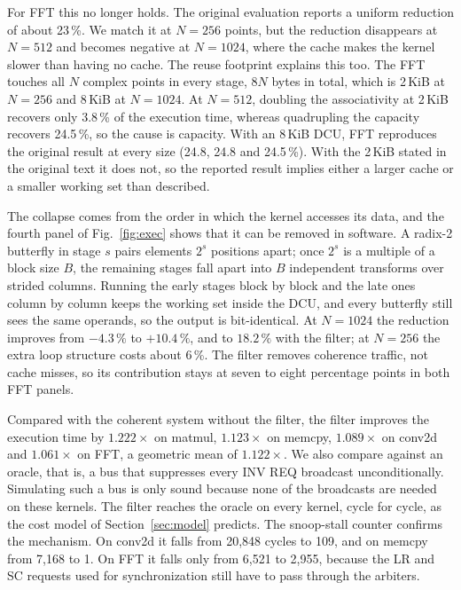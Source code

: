 \documentclass[conference]{IEEEtran}
\begin{document}
For FFT this no longer holds. The original evaluation reports a uniform
reduction of about 23\,\%. We match it at $N{=}256$ points, but the reduction
disappears at $N{=}512$ and becomes negative at $N{=}1024$, where the cache
makes the kernel slower than having no cache. The reuse footprint explains
this too. The FFT touches all $N$ complex points in every stage, $8N$
bytes in total, which is 2\,KiB at $N{=}256$ and 8\,KiB at $N{=}1024$. At
$N{=}512$, doubling the associativity at 2\,KiB recovers only 3.8\,\% of the
execution time, whereas quadrupling the capacity recovers 24.5\,\%, so the
cause is capacity. With an 8\,KiB DCU, FFT reproduces the original result at
every size (24.8, 24.8 and 24.5\,\%). With the 2\,KiB stated in the original
text it does not, so the reported result implies either a larger cache or a
smaller working set than described.

The collapse comes from the order in which the kernel accesses its data, and
the fourth panel of Fig.~\ref{fig:exec} shows that it can be removed in
software. A radix-2 butterfly in stage $s$ pairs elements $2^s$ positions
apart; once $2^s$ is a multiple of a block size $B$, the remaining stages fall
apart into $B$ independent transforms over strided columns. Running the early
stages block by block and the late ones column by column keeps the working set
inside the DCU, and every butterfly still sees the same operands, so the
output is bit-identical. At $N{=}1024$ the reduction improves from
$-4.3\,\%$ to $+10.4\,\%$, and to $18.2\,\%$ with the filter; at $N{=}256$ the
extra loop structure costs about 6\,\%. The filter removes coherence traffic,
not cache misses, so its contribution stays at seven to eight percentage
points in both FFT panels.

Compared with the coherent system without the filter, the filter improves the
execution time by $1.222\times$ on matmul, $1.123\times$ on memcpy,
$1.089\times$ on conv2d and $1.061\times$ on FFT, a geometric mean of
$1.122\times$. We also compare against an oracle, that is, a bus that
suppresses every INV REQ broadcast unconditionally. Simulating such a bus is
only sound because none of the broadcasts are needed on these kernels. The
filter reaches the oracle on every kernel, cycle for cycle, as the cost model
of Section~\ref{sec:model} predicts. The snoop-stall counter confirms the
mechanism. On conv2d it falls from 20{,}848 cycles to 109, and on memcpy from
7{,}168 to 1. On FFT it falls only from 6{,}521 to 2{,}955, because the LR and
SC requests used for synchronization still have to pass through the arbiters.
\end{document}

